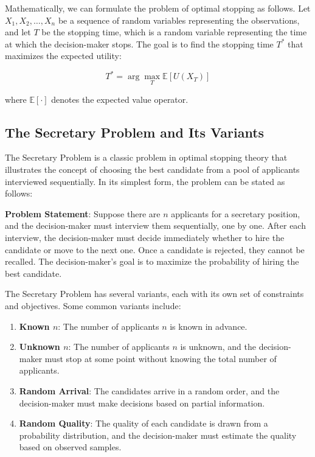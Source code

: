 \documentclass[12pt]{book} %
\begin{document}
Mathematically, we can formulate the problem of optimal stopping as follows. Let $X_1, X_2, \ldots, X_n$ be a sequence of random variables representing the observations, and let $T$ be the stopping time, which is a random variable representing the time at which the decision-maker stops. The goal is to find the stopping time $T^*$ that maximizes the expected utility:

\begin{equation*}
    T^* = \arg\max_{T} \mathbb{E}[U(X_T)]
\end{equation*}

where $\mathbb{E}[\cdot]$ denotes the expected value operator.

\subsection{The Secretary Problem and Its Variants}

The Secretary Problem is a classic problem in optimal stopping theory that illustrates the concept of choosing the best candidate from a pool of applicants interviewed sequentially. In its simplest form, the problem can be stated as follows:

\textbf{Problem Statement}: Suppose there are $n$ applicants for a secretary position, and the decision-maker must interview them sequentially, one by one. After each interview, the decision-maker must decide immediately whether to hire the candidate or move to the next one. Once a candidate is rejected, they cannot be recalled. The decision-maker's goal is to maximize the probability of hiring the best candidate.

The Secretary Problem has several variants, each with its own set of constraints and objectives. Some common variants include:

\begin{enumerate}
    \item \textbf{Known $n$}: The number of applicants $n$ is known in advance.
    \item \textbf{Unknown $n$}: The number of applicants $n$ is unknown, and the decision-maker must stop at some point without knowing the total number of applicants.
    \item \textbf{Random Arrival}: The candidates arrive in a random order, and the decision-maker must make decisions based on partial information.
    \item \textbf{Random Quality}: The quality of each candidate is drawn from a probability distribution, and the decision-maker must estimate the quality based on observed samples.
\end{enumerate}
\end{document}
